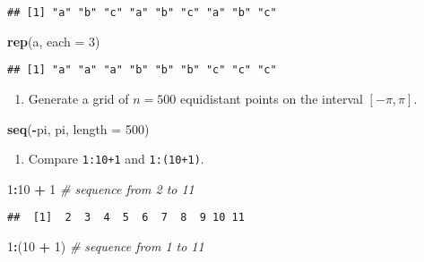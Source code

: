 \documentclass[]{article}
\newenvironment{Shaded}{\begin{snugshade}}{\end{snugshade}}
\newcommand{\KeywordTok}[1]{\textcolor[rgb]{0.13,0.29,0.53}{\textbf{#1}}}
\newcommand{\DataTypeTok}[1]{\textcolor[rgb]{0.13,0.29,0.53}{#1}}
\newcommand{\DecValTok}[1]{\textcolor[rgb]{0.00,0.00,0.81}{#1}}
\newcommand{\StringTok}[1]{\textcolor[rgb]{0.31,0.60,0.02}{#1}}
\newcommand{\CommentTok}[1]{\textcolor[rgb]{0.56,0.35,0.01}{\textit{#1}}}
\newcommand{\OperatorTok}[1]{\textcolor[rgb]{0.81,0.36,0.00}{\textbf{#1}}}
\newcommand{\NormalTok}[1]{#1}
\providecommand{\tightlist}{%
  \setlength{\itemsep}{0pt}\setlength{\parskip}{0pt}}
\begin{document}
\begin{verbatim}
## [1] "a" "b" "c" "a" "b" "c" "a" "b" "c"
\end{verbatim}

\begin{Shaded}
\begin{Highlighting}[]
\KeywordTok{rep}\NormalTok{(a, }\DataTypeTok{each =} \DecValTok{3}\NormalTok{)}
\end{Highlighting}
\end{Shaded}

\begin{verbatim}
## [1] "a" "a" "a" "b" "b" "b" "c" "c" "c"
\end{verbatim}

\begin{enumerate}
\def\labelenumi{\arabic{enumi}.}
\setcounter{enumi}{2}
\tightlist
\item
  Generate a grid of \(n=500\) equidistant points on the interval
  \([-\pi,\pi ]\).
\end{enumerate}

\begin{Shaded}
\begin{Highlighting}[]
\KeywordTok{seq}\NormalTok{(}\OperatorTok{-}\NormalTok{pi, pi, }\DataTypeTok{length =} \DecValTok{500}\NormalTok{)}
\end{Highlighting}
\end{Shaded}

\begin{enumerate}
\def\labelenumi{\arabic{enumi}.}
\setcounter{enumi}{3}
\tightlist
\item
  Compare \texttt{1:10+1} and \texttt{1:(10+1)}.
\end{enumerate}

\begin{Shaded}
\begin{Highlighting}[]
\DecValTok{1}\OperatorTok{:}\DecValTok{10} \OperatorTok{+}\StringTok{ }\DecValTok{1}    \CommentTok{# sequence from 2 to 11}
\end{Highlighting}
\end{Shaded}

\begin{verbatim}
##  [1]  2  3  4  5  6  7  8  9 10 11
\end{verbatim}

\begin{Shaded}
\begin{Highlighting}[]
\DecValTok{1}\OperatorTok{:}\NormalTok{(}\DecValTok{10} \OperatorTok{+}\StringTok{ }\DecValTok{1}\NormalTok{)  }\CommentTok{# sequence from 1 to 11}
\end{Highlighting}
\end{Shaded}
\end{document}
